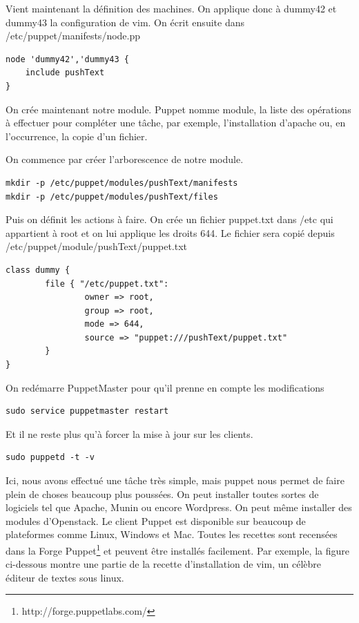\documentclass[a4paper,oneside]{report}
\begin{document}
Vient maintenant la définition des machines. On applique donc à dummy42 et dummy43 la configuration de vim. On écrit ensuite dans /etc/puppet/manifests/node.pp
\begin{verbatim}
node 'dummy42','dummy43 {
    include pushText
}
\end{verbatim}

On crée maintenant notre module. Puppet nomme module, la liste des opérations à effectuer pour compléter une tâche, par exemple, l'installation d'apache ou, en l'occurrence, la copie d'un fichier.

On commence par créer l'arborescence de notre module.
\begin{verbatim}
mkdir -p /etc/puppet/modules/pushText/manifests
mkdir -p /etc/puppet/modules/pushText/files
\end{verbatim}

Puis on définit les actions à faire. On crée un fichier puppet.txt dans /etc qui appartient à root et on lui applique les droits 644. Le fichier sera copié depuis /etc/puppet/module/pushText/puppet.txt 
\begin{verbatim}
class dummy {
        file { "/etc/puppet.txt":
                owner => root,
                group => root,
                mode => 644,
                source => "puppet:///pushText/puppet.txt"
        }
}
\end{verbatim}

On redémarre PuppetMaster pour qu'il prenne en compte les modifications
\begin{verbatim}
sudo service puppetmaster restart
\end{verbatim}

Et il ne reste plus qu'à forcer la mise à jour sur les clients.
\begin{verbatim}
sudo puppetd -t -v
\end{verbatim}

Ici, nous avons effectué une tâche très simple, mais puppet nous permet de faire plein de choses beaucoup plus poussées. On peut installer toutes sortes de logiciels tel que Apache, Munin ou encore Wordpress. 
On peut même installer des modules d'Openstack.
Le client Puppet est disponible sur beaucoup de plateformes comme Linux, Windows et Mac.
Toutes les recettes sont recensées dans la Forge Puppet\footnote{http://forge.puppetlabs.com/} et peuvent être installés facilement.
Par exemple, la figure ci-dessous montre une partie de la recette d'installation de vim, un célèbre éditeur de textes sous linux.
\end{document}
